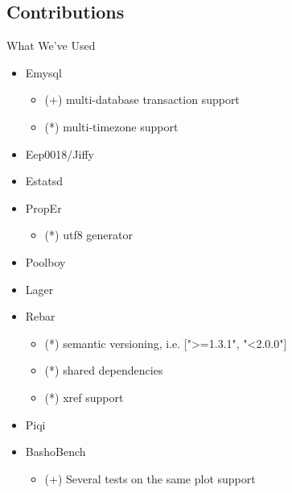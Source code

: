 \documentclass[aspectratio=169]{beamer}
\begin{document}
\subsection{Contributions}
\begin{frame}{What We've Used}
    \begin{itemize}
        \item Emysql
            \begin{itemize}
                \item (+) multi-database transaction support
                \item (*) multi-timezone support
            \end{itemize}
        \item Eep0018/Jiffy
        \item Estatsd
        \item PropEr
            \begin{itemize}
                \item (*) utf8 generator
            \end{itemize}
        \item Poolboy
        \item Lager
        \item Rebar
            \begin{itemize}
                \item (*) semantic versioning, i.e. [">=1.3.1", "<2.0.0"]
                \item (*) shared dependencies
                \item (*) xref support
            \end{itemize}
        \item Piqi
        \item BashoBench
            \begin{itemize}
                \item (+) Several tests on the same plot support
            \end{itemize}
    \end{itemize}
\end{frame}
\end{document}
